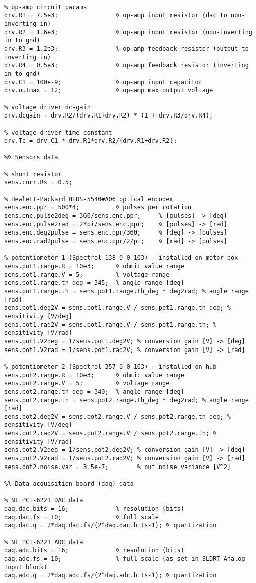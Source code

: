 \begin{lstlisting}[caption=\texttt{global\_parameters.m.},label=lst:global-params]
%% Voltage driver nominal parameters

% op-amp circuit params
drv.R1 = 7.5e3;                % op-amp input resistor (dac to non-inverting in)
drv.R2 = 1.6e3;                % op-amp input resistor (non-inverting in to gnd)
drv.R3 = 1.2e3;                % op-amp feedback resistor (output to inverting in)
drv.R4 = 0.5e3;                % op-amp feedback resistor (inverting in to gnd)
drv.C1 = 100e-9;               % op-amp input capacitor
drv.outmax = 12;               % op-amp max output voltage

% voltage driver dc-gain
drv.dcgain = drv.R2/(drv.R1+drv.R2) * (1 + drv.R3/drv.R4);

% voltage driver time constant
drv.Tc = drv.C1 * drv.R1*drv.R2/(drv.R1+drv.R2);

%% Sensors data

% shunt resistor
sens.curr.Rs = 0.5;

% Hewlett-Packard HEDS-5540#A06 optical encoder
sens.enc.ppr = 500*4;          % pulses per rotation
sens.enc.pulse2deg = 360/sens.enc.ppr;     % [pulses] -> [deg]
sens.enc.pulse2rad = 2*pi/sens.enc.ppr;    % [pulses] -> [rad]
sens.enc.deg2pulse = sens.enc.ppr/360;     % [deg] -> [pulses]
sens.enc.rad2pulse = sens.enc.ppr/2/pi;    % [rad] -> [pulses]

% potentiometer 1 (Spectrol 138-0-0-103) - installed on motor box
sens.pot1.range.R = 10e3;      % ohmic value range
sens.pot1.range.V = 5;         % voltage range
sens.pot1.range.th_deg = 345;  % angle range [deg]
sens.pot1.range.th = sens.pot1.range.th_deg * deg2rad; % angle range [rad]
sens.pot1.deg2V = sens.pot1.range.V / sens.pot1.range.th_deg; % sensitivity [V/deg]
sens.pot1.rad2V = sens.pot1.range.V / sens.pot1.range.th; % sensitivity [V/rad]
sens.pot1.V2deg = 1/sens.pot1.deg2V; % conversion gain [V] -> [deg]
sens.pot1.V2rad = 1/sens.pot1.rad2V; % conversion gain [V] -> [rad]

% potentiometer 2 (Spectrol 357-0-0-103) - installed on hub
sens.pot2.range.R = 10e3;      % ohmic value range
sens.pot2.range.V = 5;         % voltage range
sens.pot2.range.th_deg = 340;  % angle range [deg]
sens.pot2.range.th = sens.pot2.range.th_deg * deg2rad; % angle range [rad]
sens.pot2.deg2V = sens.pot2.range.V / sens.pot2.range.th_deg; % sensitivity [V/deg]
sens.pot2.rad2V = sens.pot2.range.V / sens.pot2.range.th; % sensitivity [V/rad]
sens.pot2.V2deg = 1/sens.pot2.deg2V; % conversion gain [V] -> [deg]
sens.pot2.V2rad = 1/sens.pot2.rad2V; % conversion gain [V] -> [rad]
sens.pot2.noise.var = 3.5e-7;        % out noise variance [V^2]

%% Data acquisition board (daq) data

% NI PCI-6221 DAC data
daq.dac.bits = 16;             % resolution (bits)
daq.dac.fs = 10;               % full scale
daq.dac.q = 2*daq.dac.fs/(2^daq.dac.bits-1); % quantization

% NI PCI-6221 ADC data
daq.adc.bits = 16;             % resolution (bits)
daq.adc.fs = 10;               % full scale (as set in SLDRT Analog Input block)
daq.adc.q = 2*daq.adc.fs/(2^daq.adc.bits-1); % quantization
\end{lstlisting}